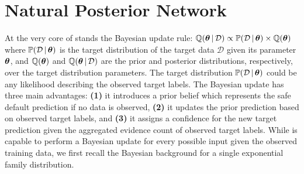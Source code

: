 \section{Natural Posterior Network}

At the very core of \NatPNacro{} stands the Bayesian update rule: $    \operatorname{\mathbb{Q}}(\bm{\theta} \,|\, \mathcal{D}) \propto \operatorname{\mathbb{P}}(\mathcal{D} \,|\, \bm{\theta}) \times \operatorname{\mathbb{Q}}(\bm{\theta})$
%
%
where $\operatorname{\mathbb{P}}(\mathcal{D} \,|\, \bm{\theta})$ is the target distribution of the target data $\mathcal{D}$ given its parameter $\bm{\theta}$, and $\operatorname{\mathbb{Q}}(\bm{\theta} )$ and $\operatorname{\mathbb{Q}}(\bm{\theta} \,|\, \mathcal{D})$ are the prior and posterior distributions, respectively, over the target distribution parameters. The target distribution $\operatorname{\mathbb{P}}(\mathcal{D} \,|\, \bm{\theta})$ could be any likelihood describing the observed target labels. The Bayesian update has three main advantages: \textbf{(1)} it introduces a prior belief which represents the safe default prediction if no data is observed, \textbf{(2)} it updates the prior prediction based on observed target labels, and \textbf{(3)} it assigns a confidence for the new target prediction given the aggregated evidence count of observed target labels. While \NatPNacro{} is capable to perform a Bayesian update for every possible input given the observed training data, we first recall the Bayesian background for a single exponential family distribution.

